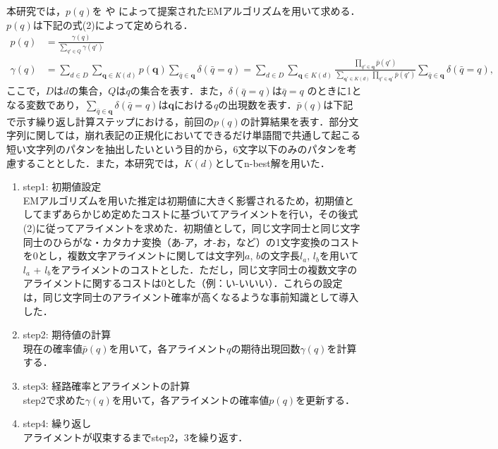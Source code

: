 \documentclass[japanese]{jnlp_1.4}
\begin{document}
本研究では，$p(q)$を\cite{Bisani:2008} や\cite{kubo2011unconstrained} によって提案されたEMアルゴリズムを用いて求める．$p(q)$は下記の式(2)によって定められる．
\begin{align}
 p(q) &= \frac{\gamma(q)}{{\displaystyle \sum_{q' \in Q}}\gamma(q')} 
	\label{eq:Estep} \\
 \gamma(q) &= \sum_{d \in D}\sum_{\mathbf{q} \in K(d)} p(\mathbf{q}) {\displaystyle \sum_{\bar q \in \mathbf{q}}} \delta(\bar q = q) 
=\sum_{d \in D}\sum_{\mathbf{q} \in K(d)}
\frac{ {\displaystyle \prod_{q' \in \mathbf{q}}}{\bar p(q')}} 
{{\displaystyle \sum_{\mathbf{q'} \in K(d)}} {\displaystyle \prod_{q' \in \mathbf{q'}} {\bar p(q')}}}
{\displaystyle \sum_{\bar q \in \mathbf{q}}}\delta(\bar q = q), 
 \nonumber
\end{align}
ここで，$D$は$d$の集合，$Q$は$q$の集合を表す．また，$\delta(\bar q = q)$は$\bar q = q$ のときに1となる変数であり，${\displaystyle \sum_{\bar q \in \mathbf{q}}}\delta(\bar q = q)$は$\mathbf{q}$における$q$の出現数を表す．${\bar p(q)}$は下記で示す繰り返し計算ステップにおける，前回の$p(q)$の計算結果を表す．部分文字列に関しては，崩れ表記の正規化においてできるだけ単語間で共通して起こる短い文字列のパタンを抽出したいという目的から，6文字以下のみのパタンを考慮することとした．また，本研究では，$K(d)$としてn-best解を用いた．

\begin{enumerate}
\item step1: 初期値設定 \\
 EMアルゴリズムを用いた推定は初期値に大きく影響されるため，初期値としてまずあらかじめ定めたコストに基づいてアライメントを行い，その後式(2)に従ってアライメントを求めた．初期値として，同じ文字同士と同じ文字同士のひらがな・カタカナ変換（あ-ア，オ-お，など）の1文字変換のコストを0とし，複数文字アライメントに関しては文字列$a$, $b$の文字長$l_a$, $l_b$を用いて$l_a$ + $l_b$をアライメントのコストとした．ただし，同じ文字同士の複数文字のアライメントに関するコストは0とした（例：い-いいい）．これらの設定は，同じ文字同士のアライメント確率が高くなるような事前知識として導入した．
\item step2: 期待値の計算 \\
現在の確率値${\bar p(q)}$を用いて，各アライメント$q$の期待出現回数$\gamma(q)$を計算する．
\item step3: 経路確率とアライメントの計算 \\
step2で求めた$\gamma(q)$を用いて，各アライメントの確率値$p(q)$を更新する．
\item step4: 繰り返し \\
アライメントが収束するまでstep2，3を繰り返す．
\end{enumerate}
\end{document}
